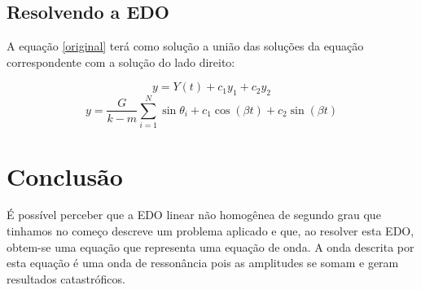 \documentclass[12pt]{article}
\begin{document}
\subsection{Resolvendo a EDO}

A equação \ref{original} terá como solução a união das soluções da equação correspondente com 
a solução do lado direito:

\[ y = Y(t) + c_1y_1 + c_2y_2\] 
\[ y = \frac{G}{k -m}\sum_{i = 1}^{N}  \sin \theta_i + c_1\cos(\beta t) + c_2 \sin(\beta t)\] 

\section{Conclusão}

É possível perceber que a EDO linear não homogênea de segundo grau que tinhamos no começo descreve
um problema aplicado e que, ao resolver esta EDO, obtem-se uma equação que representa uma equação de onda.
A onda descrita por esta equação é uma onda de ressonância pois as amplitudes se somam e geram resultados catastróficos.



\end{document}
